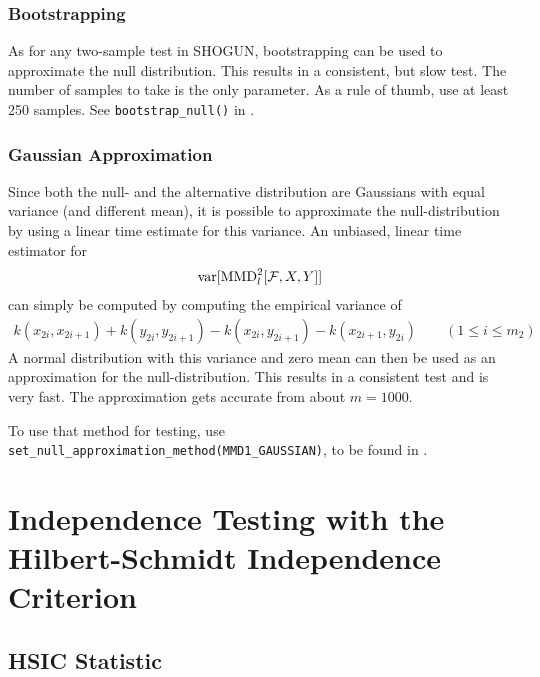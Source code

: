 \subsubsection{Bootstrapping}
As for any two-sample test in SHOGUN, bootstrapping can be used to approximate the null distribution. This results in a consistent, but slow test. The number of samples to take is the only parameter. As a rule of thumb, use at least 250 samples.
See \texttt{bootstrap\_null()} in .

\subsubsection{Gaussian Approximation}
Since both the null- and the alternative distribution are Gaussians with equal variance (and different mean), it is possible to approximate the null-distribution by using a linear time estimate for this variance. An unbiased, linear time estimator for
\begin{align*}
\operatorname{var}[\operatorname{MMD}_l^2[\mathcal{F},X,Y]]
\end{align*}
can simply be computed by computing the empirical variance of
\begin{align*}
k(x_{2i},x_{2i+1})+k(y_{2i},y_{2i+1})-k(x_{2i},y_{2i+1})-k(x_{2i+1},y_{2i}) \qquad (1\leq i\leq m_2)
\end{align*}
A normal distribution with this variance and zero mean can then be used as an approximation for the null-distribution. This results in a consistent test and is very fast. The approximation gets accurate from about $m=1000$.

To use that method for testing, use \texttt{set\_null\_approximation\_method(MMD1\_GAUSSIAN)}, to be found in .

\section{Independence Testing with the Hilbert-Schmidt Independence Criterion}
\label{sec:independence_testing_into}

\subsection{HSIC Statistic}
\label{sec:hsic_test}